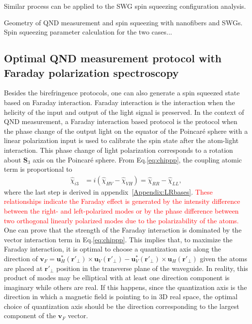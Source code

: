 \documentclass[aps,pra,twocolumn,superscriptaddress]{revtex4-1} %
\def\br{\mathbf{r}}
\newcommand{\Poincare}{Poincar\'e\xspace}
\newcommand{\comment}[1]{{\color{Maroon} #1}}
\begin{document}
Similar process can be applied to the SWG spin squeezing configuration analysis.

\comment{Geometry of QND measurement and spin squeezing with nanofibers and SWGs. Spin squeezing parameter calculation for the two cases...}

\subsection{Optimal QND measurement protocol with Faraday polarization spectroscopy}
Besides the birefringence protocols, one can also generate a spin squeezed state based on Faraday interaction.
Faraday interaction is the interaction when the helicity of the input and output of the light signal is preserved. 
In the context of QND measurement, a Faraday interaction based protocol is the protocol when the phase change of the output light on the equator of the \Poincare sphere with a linear polarization input is used to calibrate the spin state after the atom-light interaction.
This phase change of light polarization corresponds to a rotation about $ \mathbf{S}_3 $ axis on the \Poincare sphere. 
From Eq.\eqref{eq:chippp}, the coupling atomic term is proportional to 
\begin{align}
\hat{\chi}_{i3} &= i(\hat{\chi}_{HV}-\hat{\chi}_{VH})=\hat{\chi}_{RR}-\hat{\chi}_{LL},
\end{align}
where the last step is derived in appendix~\ref{Appendix:LRbases}. \textcolor{red}{These relationships indicate the Faraday effect is generated by the intensity difference between the right- and left-polarized modes or by the phase difference between two orthogonal linearly polarized modes due to the polarizability of the atoms.}
One can prove that the strength of the Faraday interaction is dominated by the vector interaction term in Eq.\eqref{eq:chippp}.
This implies that, to maximize the Faraday interaction, it is optimal to choose a quantization axis along the direction of $ \mathbf{v}_F=\mathbf{u}_H^*(\br'\!_\perp)\!\times\!\mathbf{u}_{V}(\br'\!_\perp)\!-\!\mathbf{u}_V^*(\br'\!_\perp)\!\times\!\mathbf{u}_{H}(\br'\!_\perp)$ given the atoms are placed at $ \br'\!_\perp $ position in the transverse plane of the waveguide. 
In reality, this product of modes may be elliptical with at least one direction component is imaginary while others are real.
If this happens, since the quantization axis is the direction in which a magnetic field is pointing to in 3D real space, the optimal choice of quantization axis should be the direction corresponding to the largest component of the $ \mathbf{v}_F $ vector. 
\end{document}
